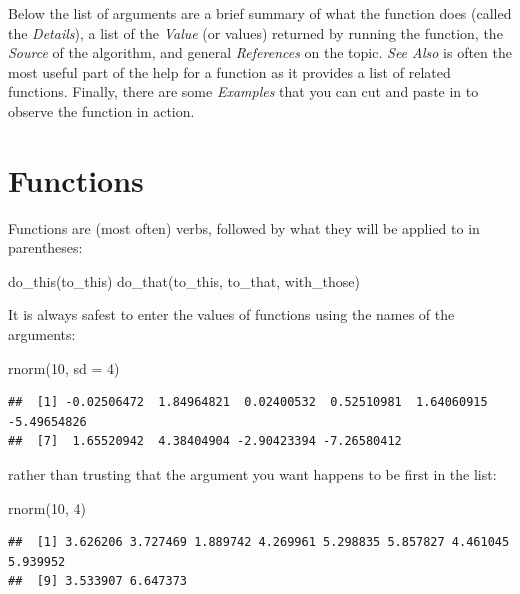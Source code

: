 \documentclass[
]{book}
\newenvironment{Shaded}{\begin{snugshade}}{\end{snugshade}}
\newcommand{\AttributeTok}[1]{\textcolor[rgb]{0.77,0.63,0.00}{#1}}
\newcommand{\DecValTok}[1]{\textcolor[rgb]{0.00,0.00,0.81}{#1}}
\newcommand{\FunctionTok}[1]{\textcolor[rgb]{0.00,0.00,0.00}{#1}}
\newcommand{\NormalTok}[1]{#1}
\begin{document}
Below the list of arguments are a brief summary of what the function does (called the \emph{Details}), a list of the \emph{Value} (or values) returned by running the function, the \emph{Source} of the algorithm, and general \emph{References} on the topic. \emph{See Also} is often the most useful part of the help for a function as it provides a list of related functions. Finally, there are some \emph{Examples} that you can cut and paste in to observe the function in action.

\hypertarget{functions}{%
\section{Functions}\label{functions}}

Functions are (most often) verbs, followed by what they will be applied to in parentheses:

\begin{Shaded}
\begin{Highlighting}[]
\FunctionTok{do\_this}\NormalTok{(to\_this)}
\FunctionTok{do\_that}\NormalTok{(to\_this, to\_that, with\_those)}
\end{Highlighting}
\end{Shaded}

It is always safest to enter the values of functions using the names of the arguments:

\begin{Shaded}
\begin{Highlighting}[]
\FunctionTok{rnorm}\NormalTok{(}\DecValTok{10}\NormalTok{, }\AttributeTok{sd =} \DecValTok{4}\NormalTok{)}
\end{Highlighting}
\end{Shaded}

\begin{verbatim}
##  [1] -0.02506472  1.84964821  0.02400532  0.52510981  1.64060915 -5.49654826
##  [7]  1.65520942  4.38404904 -2.90423394 -7.26580412
\end{verbatim}

rather than trusting that the argument you want happens to be first in the list:

\begin{Shaded}
\begin{Highlighting}[]
\FunctionTok{rnorm}\NormalTok{(}\DecValTok{10}\NormalTok{, }\DecValTok{4}\NormalTok{)}
\end{Highlighting}
\end{Shaded}

\begin{verbatim}
##  [1] 3.626206 3.727469 1.889742 4.269961 5.298835 5.857827 4.461045 5.939952
##  [9] 3.533907 6.647373
\end{verbatim}
\end{document}
